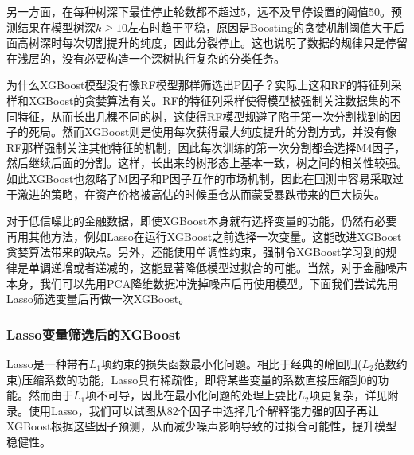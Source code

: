 \documentclass[11pt, a4paper]{article}
\begin{document}
另一方面，在每种树深下最佳停止轮数都不超过5，远不及早停设置的阈值50。预测结果在模型树深$k\ge 10$左右时趋于平稳，原因是Boosting的贪婪机制阈值大于后面高树深时每次切割提升的纯度，因此分裂停止。这也说明了数据的规律只是停留在浅层的，没有必要构造一个深树执行复杂的分类任务。

为什么XGBoost模型没有像RF模型那样筛选出P因子？实际上这和RF的特征列采样和XGBoost的贪婪算法有关。RF的特征列采样使得模型被强制关注数据集的不同特征，从而长出几棵不同的树，这使得RF模型规避了陷于第一次分割找到的因子的死局。然而XGBoost则是使用每次获得最大纯度提升的分割方式，并没有像RF那样强制关注其他特征的机制，因此每次训练的第一次分割都会选择M4因子，然后继续后面的分割。这样，长出来的树形态上基本一致，树之间的相关性较强。如此XGBoost也忽略了M因子和P因子互作的市场机制，因此在回测中容易采取过于激进的策略，在资产价格被高估的时候重仓从而蒙受暴跌带来的巨大损失。

对于低信噪比的金融数据，即使XGBoost本身就有选择变量的功能，仍然有必要再用其他方法，例如Lasso在运行XGBoost之前选择一次变量。这能改进XGBoost贪婪算法带来的缺点。另外，还能使用单调性约束，强制令XGBoost学习到的规律是单调递增或者递减的，这能显著降低模型过拟合的可能。当然，对于金融噪声本身，我们可以先用PCA降维数据冲洗掉噪声后再使用模型。下面我们尝试先用Lasso筛选变量后再做一次XGBoost。
\subsubsection{Lasso变量筛选后的XGBoost}
Lasso是一种带有$L_1$项约束的损失函数最小化问题。相比于经典的岭回归($L_2$范数约束)压缩系数的功能，Lasso具有稀疏性，即将某些变量的系数直接压缩到0的功能。然而由于$L_1$项不可导，因此在最小化问题的处理上要比$L_2$项更复杂，详见附录。使用Lasso，我们可以试图从82个因子中选择几个解释能力强的因子再让XGBoost根据这些因子预测，从而减少噪声影响导致的过拟合可能性，提升模型稳健性。
\end{document}
